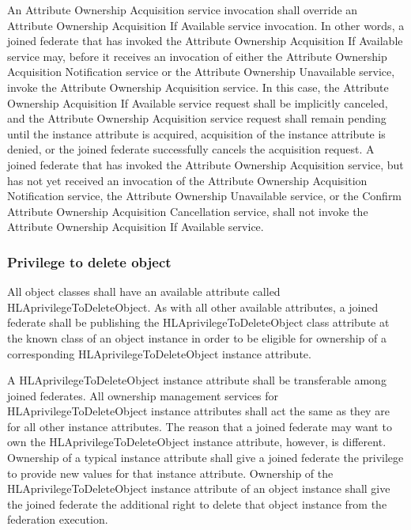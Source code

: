 \begin{compactstdpage}
    An Attribute Ownership Acquisition service invocation shall override an Attribute Ownership Acquisition If Available service invocation. In other words, a joined federate that has invoked the Attribute Ownership Acquisition If Available service may, before it receives an invocation of either the Attribute Ownership Acquisition Notification \rtiinitiated{} service or the Attribute Ownership Unavailable \rtiinitiated{} service, invoke the Attribute Ownership Acquisition service. In this case, the Attribute Ownership Acquisition If Available service request shall be implicitly canceled, and the Attribute Ownership Acquisition service request shall remain pending until the instance attribute is acquired, acquisition of the instance attribute is denied, or the joined federate successfully cancels the acquisition request. A joined federate that has invoked the Attribute Ownership Acquisition service, but has not yet received an invocation of the Attribute Ownership Acquisition Notification \rtiinitiated{} service, the Attribute Ownership Unavailable \rtiinitiated{} service, or the Confirm Attribute Ownership Acquisition Cancellation \rtiinitiated{} service, shall not invoke the Attribute Ownership Acquisition If Available service.

    \subsubsection{Privilege to delete object}


    All object classes shall have an available attribute called HLAprivilegeToDeleteObject. As with all other available attributes, a joined federate shall be publishing the HLAprivilegeToDeleteObject class attribute at the known class of an object instance in order to be eligible for ownership of a corresponding HLAprivilegeToDeleteObject instance attribute.


    A HLAprivilegeToDeleteObject instance attribute shall be transferable among joined federates. All ownership management services for HLAprivilegeToDeleteObject instance attributes shall act the same as they are for all other instance attributes. The reason that a joined federate may want to own the HLAprivilegeToDeleteObject instance attribute, however, is different. Ownership of a typical instance attribute shall give a joined federate the privilege to provide new values for that instance attribute. Ownership of the HLAprivilegeToDeleteObject instance attribute of an object instance shall give the joined federate the additional right to delete that object instance from the federation execution.


\end{compactstdpage}
